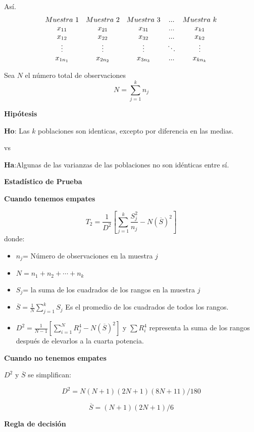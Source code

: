 \documentclass[a4paper,oneside,openany]{book}
\begin{document}
Así. \[
\begin{equation*}
\begin{array}{c c c c c} 
Muestra \ 1&Muestra\ 2&Muestra\ 3&...& Muestra\ k \\
x_{11}&x_{21}&x_{31}&...&x_{k1}\\
x_{12}&x_{22}&x_{32}&...&x_{k2}\\
\vdots&\vdots&\vdots&\ddots&\vdots\\
x_{1n_1}&x_{2n_2}&x_{3n_3}&...&x_{kn_k}\\
\end{array}
\end{equation*}
\]

Sea \(N\) el número total de observaciones \[N=\sum_{j=1}^k n_j\]

\textbf{Hipótesis}

\textbf{Ho}: Las \(k\) poblaciones son identicas, excepto por diferencia
en las medias.

vs

\textbf{Ha}:Algunas de las varianzas de las poblaciones no son idénticas
entre sí.

\textbf{Estadístico de Prueba}

\textbf{Cuando tenemos empates}

\[T_{2}= \frac{1}{D^2}\left[\sum_{j=1}^{k}\frac{S_{j}^2}{n_j}-N(\overline{S})^2\right]\]
donde:

\begin{itemize}
\item
  \(n_{j}\)= Número de observaciones en la muestra \(j\)
\item
  \(N= n_{1}+n_{2}+\cdots+n_{k}\)
\item
  \(S_{j}\)= la suma de los cuadrados de los rangos en la muestra \(j\)
\item
  \(\overline{S}= \frac{1}{N}\sum_{j=1}^{k}S_{j}\) Es el promedio de los
  cuadrados de todos los rangos.
\item
  \(D^2=\frac{1}{N-1}\left[\sum_{i=1}^{N}R^4_{j}-N(\overline{S})^2\right]\)
  y \(\sum{R_{i}^4}\) representa la suma de los rangos después de
  elevarlos a la cuarta potencia.
\end{itemize}

\textbf{Cuando no tenemos empates}

\(D^2\) y \(\overline{S}\) se simplifican:

\[D^2=N(N+1)(2N+1)(8N+11)/180\]

\[\overline{S}=(N+1)(2N+1)/6\]

\textbf{Regla de decisión}
\end{document}
